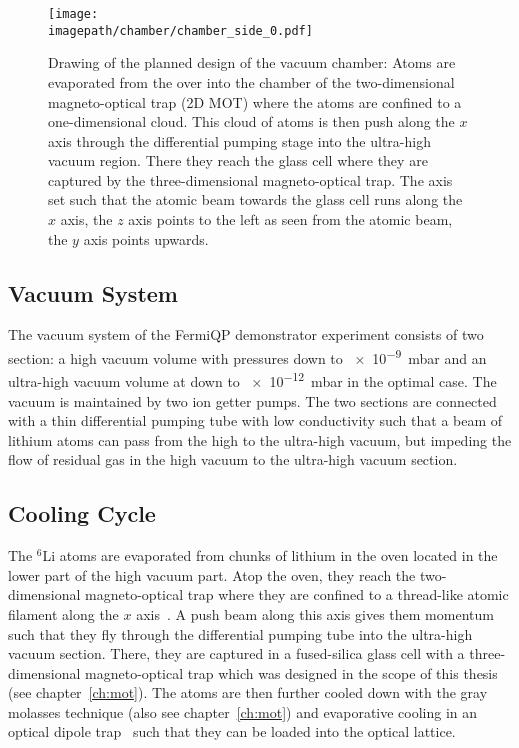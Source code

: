 \begin{figure}
    \centering
    \texttt{[image: \\imagepath/chamber/chamber\_side\_0.pdf]}
    \caption{Drawing of the planned design of the vacuum chamber: Atoms are evaporated from the over into the chamber of the two-dimensional magneto-optical trap (2D MOT) where the atoms are confined to a one-dimensional cloud. This cloud of atoms is then push along the $x$ axis through the differential pumping stage into the ultra-high vacuum region. There they reach the glass cell where they are captured by the three-dimensional magneto-optical trap. The axis set such that the atomic beam towards the glass cell runs along the $x$ axis, the $z$ axis points to the left as seen from the atomic beam, the $y$ axis points upwards.
    }
    \label{fig:chamber}
\end{figure}

\subsection*{Vacuum System}
The vacuum system of the FermiQP demonstrator experiment consists of two section: a high vacuum volume with pressures down to \SI[]{e-9}{\milli\bar} and an ultra-high vacuum volume at down to \SI[]{e-12}{\milli\bar} in the optimal case. The vacuum is maintained by two ion getter pumps. The two sections are connected with a thin differential pumping tube with low conductivity such that a beam of lithium atoms can pass from the high to the ultra-high vacuum, but impeding the flow of residual gas in the high vacuum to the ultra-high vacuum section.

\subsection*{Cooling Cycle}
The $^6$Li atoms are evaporated from chunks of lithium in the oven located in the lower part of the high vacuum part. Atop the oven, they reach the two-dimensional magneto-optical trap where they are confined to a thread-like atomic filament along the $x$ axis~\cite{qesja_design_2022}. A push beam along this axis gives them momentum such that they fly through the differential pumping tube into the ultra-high vacuum section. There, they are captured in a fused-silica glass cell with a three-dimensional magneto-optical trap which was designed in the scope of this thesis (see chapter~\ref{ch:mot}). The atoms are then further cooled down with the gray molasses technique (also see chapter~\ref{ch:mot}) and evaporative cooling in an optical dipole trap~\cite{sun_construction_2022} such that they can be loaded into the optical lattice.

